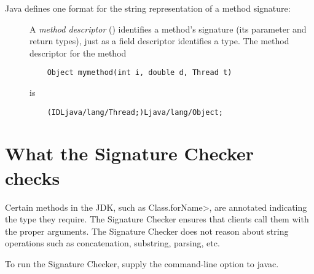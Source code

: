 Java defines one format for the string representation of a method signature:

\begin{description}

\item[]
  A \emph{method descriptor} () identifies a method's signature (its parameter and return
  types), just as a field descriptor identifies a 
  type.   The method descriptor for the method
\begin{Verbatim}
    Object mymethod(int i, double d, Thread t)
\end{Verbatim}
\noindent is
\begin{Verbatim}
    (IDLjava/lang/Thread;)Ljava/lang/Object;
\end{Verbatim}

\end{description}


\section{What the Signature Checker checks\label{signature-checks}}

Certain methods in the JDK, such as \<Class.forName>, are annotated
indicating the type they require.  The Signature Checker ensures that
clients call them with the proper arguments.  The Signature Checker does
not reason about string operations such as concatenation, substring,
parsing, etc.

To run the Signature Checker, supply the  command-line option to javac.


